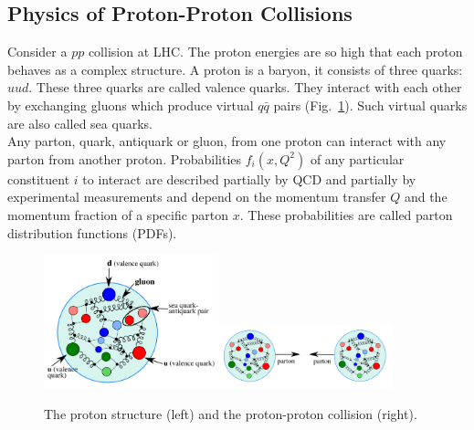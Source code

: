 \subsection{Physics of Proton-Proton Collisions}
\label{sec:Intro_ppCollisions}

Consider a $pp$ collision at LHC. The proton energies are so high that each proton behaves as a complex structure. A proton is a baryon, it consists of three quarks: $uud$. These three quarks are called valence quarks. They interact with each other by exchanging gluons which produce virtual $q\bar{q}$ pairs (Fig.~\ref{fig:ppCollision}). Such virtual quarks are also called sea quarks. \\

Any parton, quark, antiquark or gluon, from one proton can interact with any parton from another proton. Probabilities $f_i(x,Q^2)$ of any particular constituent $i$ to interact are described partially by QCD and partially by experimental measurements and depend on the momentum transfer $Q$ and the momentum fraction of a specific parton $x$. These probabilities are called parton distribution functions (PDFs).\\

\begin{figure}[htb]
  \begin{center}
    {\includegraphics[width=0.45\textwidth]{../figs/Intro/protonStructure.png}\includegraphics[width=0.45\textwidth]{../figs/Intro/ppCollision.png}}
    \caption{The proton structure (left) and the proton-proton collision (right).}
    \label{fig:ppCollision}
  \end{center}
\end{figure}

